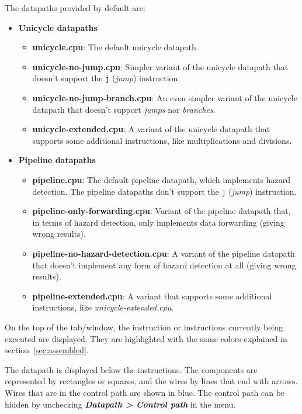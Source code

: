 \documentclass[11pt,a4paper,twoside,titlepage]{report}
\newcommand{\menupath}[1]{\textbf{\emph{#1}}}
\begin{document}
The datapaths provided by default are:
\begin{itemize}
	\item \textbf{Unicycle datapaths}
	\begin{itemize}
		\item \textbf{unicycle.cpu}: The default unicycle datapath.
		\item \textbf{unicycle-no-jump.cpu}: Simpler variant of the unicycle 
			datapath that doesn't support the \verb+j+ (\emph{jump}) 
			instruction.
		\item \textbf{unicycle-no-jump-branch.cpu}: An even simpler variant 
			of the unicycle datapath that doesn't support \emph{jumps} nor
			\emph{branches}.
		\item \textbf{unicycle-extended.cpu}: A variant of the unicycle 
			datapath that supports some additional instructions, like 
			multiplications and divisions.
	\end{itemize}
	
	\item \textbf{Pipeline datapaths}
	\begin{itemize}
		\item \textbf{pipeline.cpu}: The default pipeline datapath, which
			implements hazard detection. The pipeline datapaths don't
			support the \verb+j+ (\emph{jump}) instruction.
		\item \textbf{pipeline-only-forwarding.cpu}: Variant of the pipeline
			datapath that, in terms of hazard detection, only implements
			data forwarding (giving wrong results).
		\item \textbf{pipeline-no-hazard-detection.cpu}: A variant of the
			pipeline datapath that doesn't implement any form of hazard 
			detection at all (giving wrong results).
		\item \textbf{pipeline-extended.cpu}: A variant that supports some
			additional instructions, like \emph{unicycle-extended.cpu}.
	\end{itemize}
\end{itemize}

On the top of the tab/window, the instruction or instructions currently 
being executed are displayed. They are highlighted with the same colors
explained in section~\ref{sec:assembled}.

The datapath is displayed below the instructions.
The components are represented by rectangles or squares, and the wires by
lines that end with arrows.
Wires that are in the control path are shown in blue.
The control path can be hidden by unchecking
\menupath{Datapath > Control path} in the menu.
\end{document}
